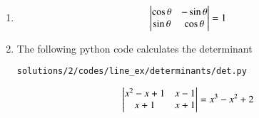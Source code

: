 \begin{enumerate}



\item 
\begin{align}
\begin{vmatrix}\cos\theta& -\sin\theta\\ \sin\theta& \cos\theta \end{vmatrix} =  1
\end{align}
\item The following python code calculates the determinant
\begin{lstlisting}
solutions/2/codes/line_ex/determinants/det.py
\end{lstlisting}
%
\begin{align}
\begin{vmatrix}
x^2-x+1& x-1\\ x+1&  x+1
\end{vmatrix} = x^3 - x^2 + 2
\end{align}

\end{enumerate}

